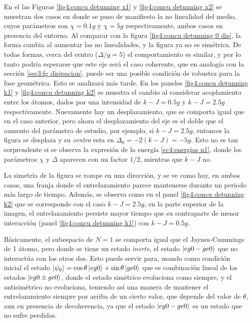 En el las Figuras \ref{fig4:concu detunning x1} y \ref{fig4:concu detunning x2} se muestran dos casos en donde se puso de manifiesto la no linealidad del medio, cuyos parámetros son $\chi=0.1g$ y $\chi=5g$ respectivamente, ambos casos en presencia del entorno. Al comparar con la figura \ref{fig4:concu detunning 0 dis}, la forma cambia al aumentar las no linealidades, y la figura ya no es simétrica. De todas formas, cerca del centro ($\Delta/g=5$) el comportamiento es similar, y por lo tanto podría esperarse que este eje será el caso coherente, que en analogía con la sección \ref{sec3:fg disipacion}, puede ser una posible condición de robustez para la fase geométrica. Esto se analizará más tarde. En los paneles \ref{fig4:concu detunning k1} y \ref{fig4:concu detunning k2} se muestra el cambio al considerar acoplamiento entre los átomos, dados por una intensidad de $k-J=0.5g$ y $k-J=2.5g$ respectivamente. Nuevamente hay un desplazamiento, que se comporta igual que en el caso anterior, pero ahora el desplazamiento del eje es el doble que el aumento del parámetro de estudio, por ejemplo, si $k-J=2.5g$, entonces la figura se desplaza y su \textit{centro} esta en $\Delta_0=-2(k-J)=-5g$. Esto no es tan sorprendente si se observa la expresión de la energía \ref{ec4:energias n1}, donde los parámetros $\chi$ y $\Delta$ aparecen con un factor $1/2$, mientras que $k-J$ no. 

La simetría de la figura se rompe en una dirección, y se ve como hay, en ambos casos, una franja donde el entrelazamiento parece mantenerse durante un periodo más largo de tiempo. Además, se observa como en el panel \ref{fig4:concu detunning k2} que se corresponde con el caso $k-J=2.5g$, en la parte superior de la imagen, el entrelazamiento persiste mayor tiempo que su contraparte de menor interacción (panel \ref{fig4:concu detunning k1}) con $k-J=0.5g$.

Básicamente, el subespacio de $N=1$ se comporta igual que el Jaynes-Cummings de 1 átomo, pero donde se tiene un estado \textit{inerte}, el estado $\ket{eg0-ge0}$ que no interactúa con los otros dos. Esto puede servir para, usando como condición inicial el estado $\ket{\psi_0}=\cos\theta\ket{eg0}+\sin\theta\ket{ge0}$ que es combinación lineal de los estados $\ket{eg0\pm ge0}$, donde el estado simétrico evoluciona como siempre, y el antisimétrico no evoluciona, teniendo así una manera de mantener el entrelazamiento siempre por arriba de un cierto valor, que depende del valor de $\theta$, aun en presencia de decoherencia, ya que el estado $\ket{eg0-ge0}$ es un estado que no sufre perdidas.


